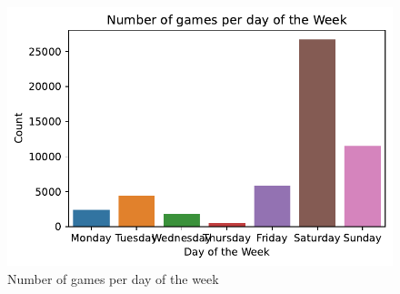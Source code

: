 \documentclass[
  letterpaper,
  DIV=11,
  numbers=noendperiod]{scrartcl}
\begin{document}
\begin{figure}[H]

{\centering \includegraphics{Blog_post_files/figure-pdf/fig-count_day-output-1.pdf}

}

\caption{\label{fig-count_day}Number of games per day of the week}

\end{figure}
\end{document}
